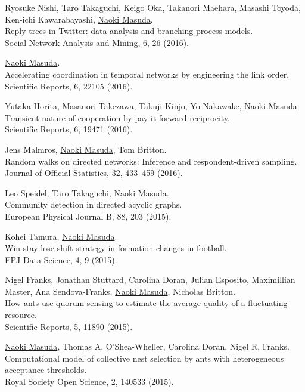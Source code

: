 \documentclass[11pt,letter]{article}
\begin{document}
\begin{etaremune}
\item Ryosuke Nishi, Taro Takaguchi, Keigo Oka, Takanori Maehara, Masashi Toyoda, Ken-ichi Kawarabayashi, \underline{Naoki Masuda}.\\
Reply trees in Twitter: data analysis and branching process models.\\
Social Network Analysis and Mining, 6, 26 (2016).

\item \underline{Naoki Masuda}.\\
Accelerating coordination in temporal networks by engineering the link order.\\
Scientific Reports, 6, 22105 (2016).

\item Yutaka Horita, Masanori Takezawa, Takuji Kinjo, Yo Nakawake, \underline{Naoki Masuda}.\\
Transient nature of cooperation by pay-it-forward reciprocity.\\
Scientific Reports, 6, 19471 (2016).

\item Jens Malmros, \underline{Naoki Masuda}, Tom Britton.\\
Random walks on directed networks: Inference and respondent-driven sampling.\\
Journal of Official Statistics, 32, 433--459 (2016).

\item Leo Speidel, Taro Takaguchi, \underline{Naoki Masuda}.\\
Community detection in directed acyclic graphs.\\
European Physical Journal B, 88, 203 (2015).

\item Kohei Tamura, \underline{Naoki Masuda}.\\
Win-stay lose-shift strategy in formation changes in football.\\
EPJ Data Science, 4, 9 (2015).

\item Nigel Franks, Jonathan Stuttard, Carolina Doran, Julian Esposito, Maximillian Master, Ana Sendova-Franks, \underline{Naoki Masuda}, Nicholas Britton.\\
How ants use quorum sensing to estimate the average quality of a fluctuating resource.\\
Scientific Reports, 5, 11890 (2015).

\item \underline{Naoki Masuda}, Thomas A. O'Shea-Wheller, Carolina Doran, Nigel R. Franks.\\
Computational model of collective nest selection by ants with heterogeneous acceptance thresholds.\\
Royal Society Open Science, 2, 140533 (2015).


\end{etaremune}
\end{document}
